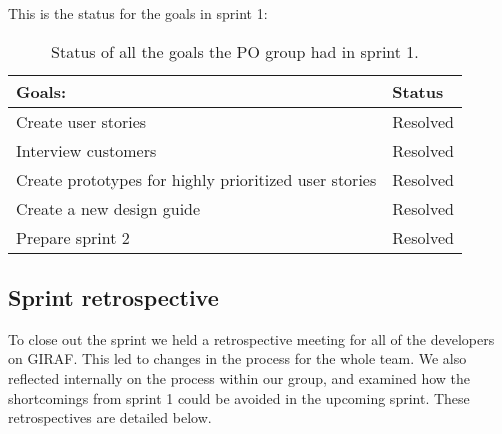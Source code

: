 \noindent
This is the status for the goals in sprint 1:
\begin{table}[H]
    \centering
    \begin{tabular}{|l|l|}
    \hline
    Goals:                                 & Status   \\ \hline
    Create user stories                    & Resolved \\ \hline
    Interview customers                    & Resolved \\ \hline
    Create prototypes for highly prioritized user stories & Resolved \\ \hline
    Create a new design guide                & Resolved \\ \hline
    Prepare sprint 2                       & Resolved \\ \hline
    \end{tabular}
    \caption{Status of all the goals the PO group had in sprint 1.}
    \label{PO-goal-review-sprint-1}
\end{table}

\subsection{Sprint retrospective}
To close out the sprint we held a retrospective meeting for all of the developers on GIRAF.
This led to changes in the process for the whole team.
We also reflected internally on the process within our group, and examined how the shortcomings from sprint 1 could be avoided in the upcoming sprint.
These retrospectives are detailed below.

